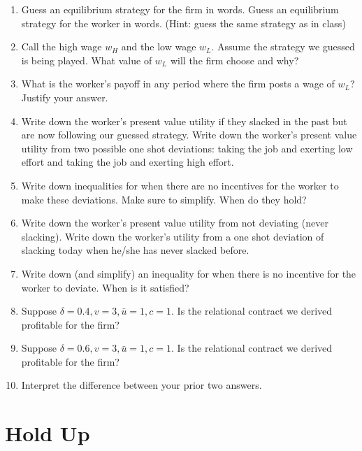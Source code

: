 \documentclass{article}
\begin{document}
\begin{enumerate}
    \item Guess an equilibrium strategy for the firm in words. Guess an equilibrium strategy for the worker in words. (Hint: guess the same strategy as in class)

    

        \item Call the high wage $w_H$ and the low wage $w_L$. Assume the strategy we guessed is being played. What value of $w_L$ will the firm choose and why?

 
    \item What is the worker's payoff in any period where the firm posts a wage of $w_L$? Justify your answer.

    \item Write down the worker's present value utility if they slacked in the past but are now following our guessed strategy. Write down the worker's present value utility from two possible one shot deviations: taking the job and exerting low effort and taking the job and exerting high effort.

     \item Write down inequalities for when there are no incentives for the worker to make these deviations. Make sure to simplify. When do they hold?

    
    \item Write down the worker's present value utility from not deviating (never slacking). Write down the worker's utility from a one shot deviation of slacking today when he/she has never slacked before.

    \item Write down (and simplify) an inequality for when there is no incentive for the worker to deviate. When is it satisfied?

    
    \item Suppose $\delta = 0.4, v=3, \bar u = 1, c=1$. Is the relational contract we derived profitable for the firm?
    \item Suppose $\delta = 0.6, v=3, \bar u= 1,c=1$. Is the relational contract we derived profitable for the firm?

    \item Interpret the difference between your prior two answers.
\end{enumerate}

\section{Hold Up}
\end{document}
